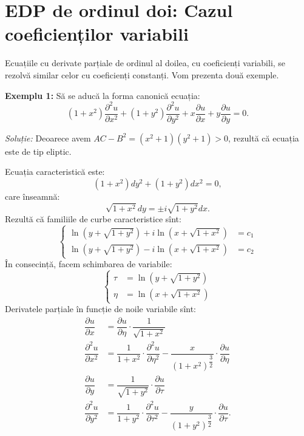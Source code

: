 \chapter{EDP de ordinul doi: Cazul coeficienților variabili}


\indent\indent Ecuațiile cu derivate parțiale de ordinul al doilea, cu coeficienți variabili,
se rezolvă similar celor cu coeficienți constanți. Vom prezenta două exemple.

\textbf{Exemplu 1:} Să se aducă la forma canonică ecuația:
\[
  (1 + x^2)\dfrac{\partial^2 u}{\partial x^2} + %
  (1 + y^2)\dfrac{\partial^2 u}{\partial y^2} + %
  x \dfrac{\partial u}{\partial x} + y \dfrac{\partial u}{\partial y} = 0.
\]

\emph{Soluție:} Deoarece avem $ AC - B^2 = (x^2 + 1)(y^2 + 1) > 0 $, rezultă
că ecuația este de tip eliptic.

Ecuația caracteristică este:
\[
  (1 + x^2)dy^2 + (1 + y^2) dx^2 = 0,
\]
care înseamnă:
\[
  \sqrt{1 + x^2} dy = \pm i \sqrt{1 + y^2} dx.
\]
Rezultă că familiile de curbe caracteristice sînt:
\[
  \begin{cases}
    \ln(y + \sqrt{1 + y^2}) + i \ln(x + \sqrt{1 + x^2}) &= c_1 \\
    \ln(y + \sqrt{1 + y^2}) - i \ln(x + \sqrt{1 + x^2}) &= c_2
  \end{cases}
\]
În consecință, facem schimbarea de variabile:
\[
  \begin{cases}
    \tau &= \ln(y + \sqrt{1 + y^2}) \\
    \eta &= \ln(x + \sqrt{1 + x^2})
  \end{cases}
\]
Derivatele parțiale în funcție de noile variabile sînt:
\begin{align*}
  \dfrac{\partial u}{\partial x} &= \dfrac{\partial u}{\partial \eta} \cdot %
                                  \dfrac{1}{\sqrt{1 + x^2}} \\
  \dfrac{\partial^2 u}{\partial x^2} &= \dfrac{1}{1 + x^2} \cdot \dfrac{\partial^2 u}{\partial \eta^2}%
                                      - \dfrac{x}{(1 + x^2)^{\dfrac{3}{2}}} \cdot %
                                      \dfrac{\partial u}{\partial \eta} \\
  \dfrac{\partial u}{\partial y} &= \dfrac{1}{\sqrt{1 + y^2}} \cdot \dfrac{\partial u}{\partial \tau} \\
  \dfrac{\partial^2 u}{\partial y^2} &= \dfrac{1}{1 + y^2} \cdot \dfrac{\partial^2 u}{\partial \tau^2}%
                                      - \dfrac{y}{(1 + y^2)^{\dfrac{3}{2}}} \cdot %
                                      \dfrac{\partial u}{\partial \tau}.
\end{align*}

